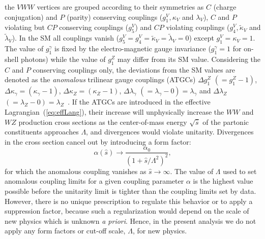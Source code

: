   the $VWW$ vertices are grouped according to their symmetries as $C$ (charge conjugation) 
  and $P$ (parity) conserving couplings ($g_{1}^{V}, {\kappa}_{V}$ and $\lambda_{V}$), 
  $C$ and $P$ violating but $CP$ conserving couplings ($g_{5}^{V}$) and $CP$ violating 
  couplings ($g_{4}^{V}, \tilde{\kappa}_{V}$ and $\tilde{\lambda}_{V}$).  In the SM all 
  couplings vanish ($g_{5}^{V}=g_{4}^{V}=\tilde{\kappa}_{V}=\tilde{\lambda}_{V}=0$) except 
  $g_{1}^{V}=\kappa_{V}=1$.  The value of $g_{1}^{\gamma}$ is fixed by the electro-magnetic 
  gauge invariance ($g_{1}^{\gamma}=1$ for on-shell photons) while the value of $g_{1}^{Z}$ 
  may differ from its SM value.  Considering the $C$ and $P$ conserving couplings 
  only, the deviations from the SM values are denoted as the {\textit{anomalous}} 
  trilinear gauge couplings (ATGCs) $\Delta g_{1}^{Z}$ $(=g_{1}^{Z}-1)$, $\Delta\kappa_{\gamma}=
  (\kappa_{\gamma}-1)$, $\Delta\kappa_{Z}=(\kappa_{Z}-1)$, $\Delta\lambda_{\gamma}$ 
  $(=\lambda_{\gamma}-0)=\lambda_{\gamma}$ and $\Delta\lambda_{Z}$ 
  $(=\lambda_{Z}-0)=\lambda_{Z}$~\cite{PhysRevD.41.2113, MCFM}.  If the ATGCs are 
  introduced in the effective Lagrangian~(\ref{eq:effLang}), their increase 
  will unphysically increase the $WW$ and $WZ$ production cross sections as the 
  center-of-mass energy $\sqrt{\hat{s}}$ of the partonic constituents approaches 
  $\Lambda$, and divergences would violate unitarity.  Divergences in the cross section 
  cancel out by introducing a form factor: 
  \begin{equation}
   \alpha(\hat{s})\rightarrow \frac{\alpha_{0}}{(1+\hat{s}/\Lambda^{2})^{2}},
   \label{eq:alpha}
  \end{equation}
  \noindent for which the anomalous coupling vanishes as $\hat{s}\rightarrow\infty$.  The 
  value of $\Lambda$ used to set anomalous coupling limits for a given coupling 
  parameter $\alpha$ is the highest value possible before the unitarity limit is 
  tighter than the coupling limits set by data. However, there is no unique 
  prescription to regulate this behavior or to apply a suppression factor, 
  because such a regularization would depend on the scale of new physics which 
  is unknown \textit{a priori}. Hence, in the present analysis we do not apply 
  any form factors or cut-off scale, $\Lambda$, for new physics.


